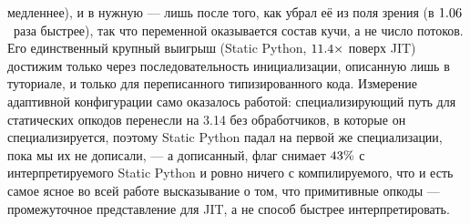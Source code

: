 медленнее), и в нужную --- лишь после того, как  убрал её из поля
зрения (в $\meas{ratio:b6_gcscale-fork_cinderx:gc_collect/fork_cinderx/immortal_serial|b6_gcscale-fork_cinderx:gc_collect/fork_cinderx/immortal_par6}{1.06}$~раза быстрее), так что переменной оказывается состав кучи, а не число потоков. Его единственный крупный выигрыш (Static
Python, $\meas{ratio:b6_static-fork_static_adaptive:matmul96_int/fork_static_adaptive/boxed_jit|b6_static-fork_static_adaptive:matmul96_int/fork_static_adaptive/static_jit}{11.4}\times$ поверх JIT) достижим только через последовательность
инициализации, описанную лишь в туториале, и только для переписанного типизированного кода. Измерение адаптивной конфигурации
само оказалось работой: специализирующий путь для статических опкодов перенесли на 3.14 без
обработчиков, в которые он специализируется, поэтому Static Python падал на первой же специализации,
пока мы их не дописали, --- а дописанный, флаг снимает $\meas{saving:b6_static-fork_static_adaptive:matmul96_int/fork_static_adaptive/static_interp|b6_static-fork_static:matmul96_int/fork_static/static_interp}{43}\%$ с интерпретируемого Static Python и
ровно ничего с компилируемого, что и есть самое ясное во всей работе высказывание о том, что
примитивные опкоды --- промежуточное представление для JIT, а не способ быстрее интерпретировать.

